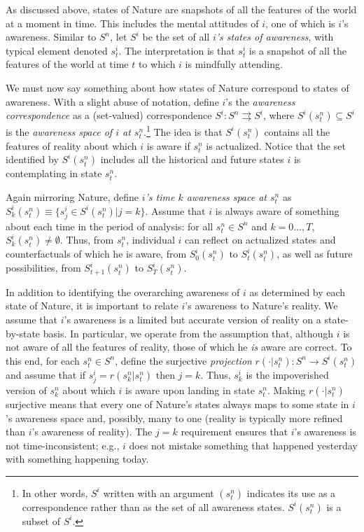 \documentclass[
11pt,
titlepage,
reqno,
]{article}%
\theoremstyle{definition}
\begin{document}
As discussed above, states of Nature are snapshots of all the features of the world at a moment in time.
This includes the mental attitudes of $i$, one of which is $i$'s awareness.
Similar to $S^n$, let $S^i$ be the set of all \textit{$i$'s states of awareness}, with typical element denoted $s^i_t$.
The interpretation is that $s^i_t$ is a snapshot of all the features of the world at time $t$ to which $i$ is mindfully attending.

We must now say something about how states of Nature correspond to states of awareness.
With a slight abuse of notation, define $i$'s the \textit{awareness correspondence} as a (set-valued) correspondence $S^i:S^n\rightrightarrows S^i$, where $S^i(s^n_t)\subseteq S^i$ is the \textit{awareness space of $i$ at $s^n_t$}.\footnote
{
	In other words, $S^i$ written with an argument $(s^n_t)$ indicates its use as a correspondence rather than as the set of all awareness states. $S^i(s^n_t)$ is a subset of $S^i$. 
} 
The idea is that  $S^i(s^n_t)$ contains all the features of reality about which $i$ is aware if $s^n_t$ is actualized. 
Notice that the set identified by $S^i(s^n_t)$ includes all the historical and future states $i$ is contemplating in state $s^n_t$.

Again mirroring Nature, define \textit{$i$'s time $k$ awareness space at $s^n_t$} as  $S^i_k(s^n_t)\equiv\{s^i_j\in S^i(s^n_t)|j=k\}$.
Assume that $i$ is always aware of something about each time in the period of analysis: for all $s^n_t\in S^n$ and $k=0\ldots,T$, $S^i_k(s^n_t)\ne\emptyset$.
Thus, from $s^n_t$, individual $i$ can reflect on actualized states and counterfactuals of which he is aware,  from $S^i_0(s^n_t)$ to $S^i_t(s^n_t)$, as well as future possibilities, from $S^i_{t+1}(s^n_t)$ to $S^i_T(s^n_t)$.

In addition to identifying the overarching awareness of $i$ as determined by each state of Nature, it is important to relate $i$'s awareness to Nature's reality. 
We assume that $i$'s awareness is a limited but accurate version of reality on a state-by-state basis.
In particular, we  operate from the assumption that, although $i$ is not aware of all the features of reality,  those of which he \textit{is} aware are correct.  
To this end, for each $s^n_t\in S^n$, define the surjective \textit{projection} $r(\cdot|s^n_t):S^n\rightarrow S^i(s^n_t)$ and assume that if $s^i_j=r(s^n_k|s^n_t)$ then $j=k$.
Thus,  $s^i_k$ is the impoverished version of $s^n_k$ about which $i$ is aware upon landing in state $s^n_t$.
Making $r(\cdot|s^n_t)$ surjective means that every one of Nature's states always maps to some state in $i$'s awareness space and, possibly, many to one (reality is typically more refined than $i$'s awareness of reality).
The  $j=k$ requirement ensures that $i$'s awareness is not time-inconsistent; e.g., $i$ does not mistake something that happened yesterday with something happening today.
\end{document}
